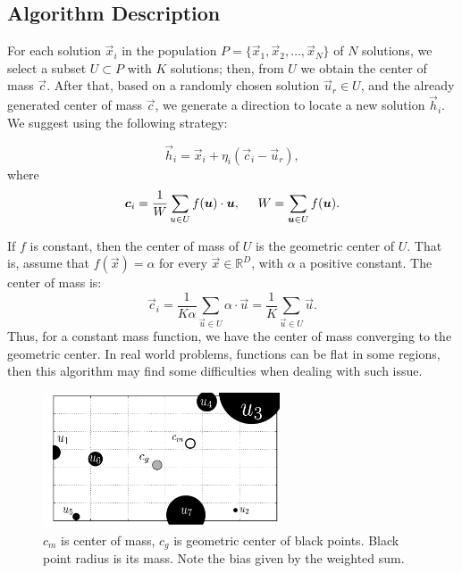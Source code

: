 \documentclass[graybox]{svmult}
\begin{document}
\subsection{Algorithm Description} %
\label{sub:algorithm_description}

For each solution $\vec{x}_i $ in the population $P = \{ \vec{x}_1, \vec{x}_2, \ldots, \vec{x}_{N} \} $ of $N$ 
solutions, we select a subset $U \subset P $ with $K$ solutions; then, 
from $U$ we obtain the center of mass $\vec{c}$. After that, based on 
a randomly chosen solution $\vec{u}_r \in U$,  
and the already generated center of mass $\vec{c}$, we generate a direction 
to locate a new solution $ \vec{h}_i$. We suggest using the following strategy:

\begin{equation}
	\vec{h}_i = \vec{x}_i + \eta _{i} ( \vec{c}_i - \vec{u}_{r} ),
	\label{eqn:vcu}
\end{equation}
%
where 
%
\begin{equation}
	\vec{c}_i = \dfrac{1} {W} \sum_{u \in U} f(\vec{u}) \cdot \vec{u} , 
			\hspace{0.5cm} 
			W = \sum_{ \vec{u} \in U} f(\vec{u}).
	\label{eqn:center}
\end{equation}

\begin{note}
	If $f$ is constant, then the center of mass of $U$ is the geometric 
	center of  $U$. That is, assume that $f(\vec{x}) = \alpha$ for every 
	$\vec{x} \in \mathbb{R}^D$,  with $\alpha$ a positive constant. The 
	center of mass is:
%
\begin{equation}
	\vec{c}_i = \dfrac{1} {K \alpha} \sum_{ \vec{u} \in U} \alpha \cdot \vec{u} =  \dfrac{1} {K } \sum_{\vec{u} \in U} \vec{u}.
	\label{eqn:center-geometric}
\end{equation}
%
Thus, for a constant mass function, we have the center of mass converging 
to the geometric center. In real world problems, functions can be flat 
in some regions, then this algorithm may find some difficulties  when 
dealing with such issue.
\end{note}

\begin{figure}[!ht]
	\sidecaption
	\includegraphics[width=7cm]{img/masses.pdf}
	\caption{$c_m$ is center of mass, $c_g$ is geometric center of black points. 
	Black point radius is its mass. Note the bias given by the weighted sum.}
	\label{fig:masses}       %
\end{figure}
\end{document}
